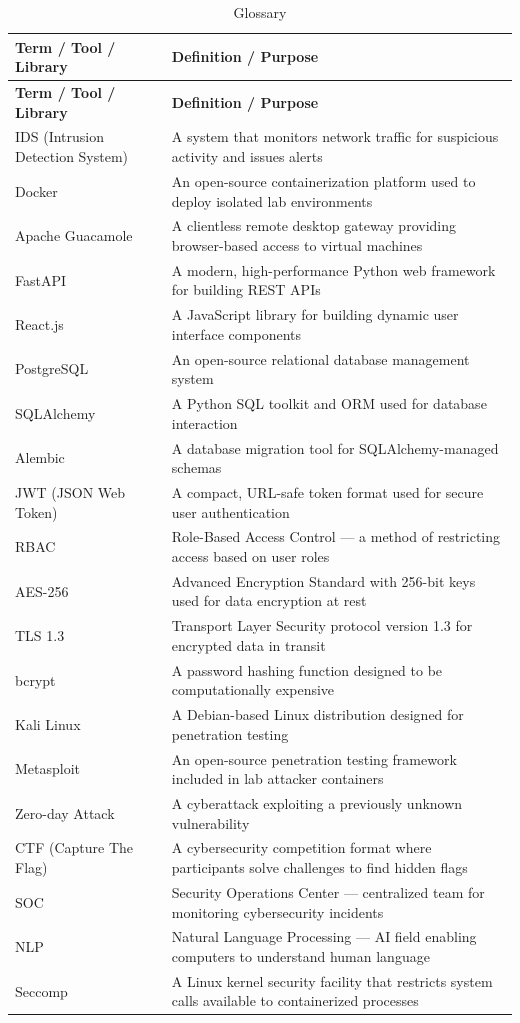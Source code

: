 \documentclass[12pt,a4paper]{report}
\newcommand{\hrow}{}
\newcommand{\hcell}[1]{\textbf{#1}}
\newcommand{\altrow}{}
\begin{document}
\begin{longtable}{|L{4.2cm}|L{9.8cm}|}
\caption{Glossary}\label{tab:glossary}\\
\hline
\hrow \hcell{Term / Tool / Library} & \hcell{Definition / Purpose} \\
\hline
\endfirsthead
\hline
\hrow \hcell{Term / Tool / Library} & \hcell{Definition / Purpose} \\
\hline
\endhead
IDS (Intrusion Detection System) & A system that monitors network traffic for suspicious activity and issues alerts \\\hline
\altrow Docker & An open-source containerization platform used to deploy isolated lab environments \\\hline
Apache Guacamole & A clientless remote desktop gateway providing browser-based access to virtual machines \\\hline
\altrow FastAPI & A modern, high-performance Python web framework for building REST APIs \\\hline
React.js & A JavaScript library for building dynamic user interface components \\\hline
\altrow PostgreSQL & An open-source relational database management system \\\hline
SQLAlchemy & A Python SQL toolkit and ORM used for database interaction \\\hline
\altrow Alembic & A database migration tool for SQLAlchemy-managed schemas \\\hline
JWT (JSON Web Token) & A compact, URL-safe token format used for secure user authentication \\\hline
\altrow RBAC & Role-Based Access Control --- a method of restricting access based on user roles \\\hline
AES-256 & Advanced Encryption Standard with 256-bit keys used for data encryption at rest \\\hline
\altrow TLS 1.3 & Transport Layer Security protocol version 1.3 for encrypted data in transit \\\hline
bcrypt & A password hashing function designed to be computationally expensive \\\hline
\altrow Kali Linux & A Debian-based Linux distribution designed for penetration testing \\\hline
Metasploit & An open-source penetration testing framework included in lab attacker containers \\\hline
\altrow Zero-day Attack & A cyberattack exploiting a previously unknown vulnerability \\\hline
CTF (Capture The Flag) & A cybersecurity competition format where participants solve challenges to find hidden flags \\\hline
\altrow SOC & Security Operations Center --- centralized team for monitoring cybersecurity incidents \\\hline
NLP & Natural Language Processing --- AI field enabling computers to understand human language \\\hline
\altrow Seccomp & A Linux kernel security facility that restricts system calls available to containerized processes \\\hline
\end{longtable}
\end{document}

